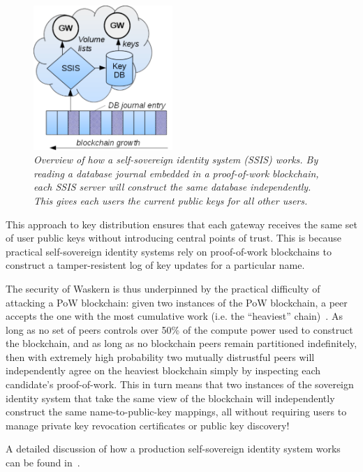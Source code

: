 \begin{figure}[t!]
\centering
\includegraphics[width=0.47\textwidth]{figures/blockstack-overview}
\caption{\it
   Overview of how a self-sovereign identity system (SSIS) works.  By reading a
   database journal embedded in a proof-of-work blockchain, each SSIS server
   will construct the same database independently.  This gives each
   users the current public keys for all other users.
   }
\label{fig:cert-graph}
\end{figure}

This approach to key distribution ensures that each gateway receives the same
set of user public keys without introducing central points of trust. This is
because practical self-sovereign identity systems rely on proof-of-work
blockchains to construct a tamper-resistent log of key updates for a particular
name.

The security of Waskern is thus underpinned by the practical difficulty of attacking a
PoW blockchain: given two instances of the PoW blockchain,
a peer accepts the one with the most cumulative work (i.e. the
``heaviest'' chain)~\cite{bitcoin-textbook}. As long as no set of peers controls over 50\% of the
compute power used to construct the blockchain, and as long as no blockchain
peers remain partitioned indefinitely, then with extremely high probability two
mutually distrustful peers will independently agree on the heaviest blockchain
simply by inspecting each candidate's proof-of-work.  This in turn means
that two instances of the sovereign identity system that take the same view of
the blockchain will independently construct the same name-to-public-key
mappings, all without requiring users to manage private key revocation
certificates or public key discovery!

A detailed discussion of how a production self-sovereign identity system
works can be found in~\cite{blockstack}.

